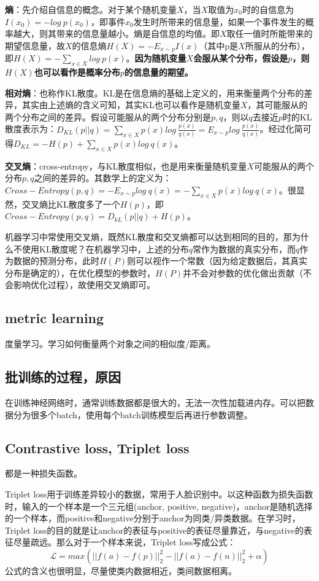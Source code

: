 \textbf{熵}：先介绍自信息的概念。对于某个随机变量$X$，当$X$取值为$x_0$时的自信息为$I(x_0) = -log\ p(x_0)$，即事件$x_0$发生时所带来的信息量，如果一个事件发生的概率越大，则其带来的信息量越小。熵是自信息的均值。即$X$取任一值时所能带来的期望信息量，故$X$的信息熵$H(X) = -E_{x\sim p}I(x)$（其中p是$X$所服从的分布），即$H(X) = -\sum_{x \in X}log\ p(x)$。\textbf{因为随机变量$X$会服从某个分布，假设是$p$，则$H(X)$也可以看作是概率分布$p$的信息量的期望。}

\textbf{相对熵}：也称作KL散度。KL是在信息熵的基础上定义的，用来衡量两个分布的差异，其实由上述熵的含义可知，其实KL也可以看作是随机变量$X$，其可能服从的两个分布之间的差异。假设可能服从的两个分布分别是$p, q$，则以$q$去接近$p$时的KL散度表示为：$D_{KL}(p||q) = \sum_{x \in X} p(x) log\ \frac{p(x)}{q(x)} = E_{x\sim p} log\ \frac{p(x)}{q(x)}$。经过化简可得$D_{KL} = -H(p) + \sum_{x \in X}p(x)log\ q(x)$。

\textbf{交叉熵}：\label{ce}cross-entropy，与KL散度相似，也是用来衡量随机变量$X$可能服从的两个分布$p, q$之间的差异的。其数学上的定义为：$Cross-Entropy(p, q) = -E_{x\sim p} log\ q(x) = - \sum_{x \in X}p(x)log\ q(x)$。很显然，交叉熵比KL散度多了一个$H(p)$，即$Cross-Entropy(p, q) = D_{kL}(p || q) + H(p)$。

机器学习中常使用交叉熵，既然KL散度和交叉熵都可以达到相同的目的，那为什么不使用KL散度呢？在机器学习中，上述的分布$q$常作为数据的真实分布，而$q$作为数据的预测分布，此时$H(P)$则可以视作一个常数（因为给定数据后，其真实分布是确定的），在优化模型的参数时，$H(P)$并不会对参数的优化做出贡献（不会影响优化过程），故使用交叉熵即可。

\subsection{metric learning} 
度量学习。学习如何衡量两个对象之间的相似度/距离。



\subsection{批训练的过程，原因}
在训练神经网络时，通常训练数据都是很大的，无法一次性加载进内存。可以把数据分为很多个batch，使用每个batch训练模型后再进行参数调整。

\subsection{Contrastive loss, Triplet loss} 
都是一种损失函数。

Triplet loss用于训练差异较小的数据，常用于人脸识别中。以这种函数为损失函数时，输入的一个样本是一个三元组(anchor, positive, negative)，anchor是随机选择的一个样本，而positive和negative分别于anchor为同类/异类数据。在学习时，Triplet loss的目的就是让anchor的表征与positive的表征尽量靠近，与negative的表征尽量疏远。那么对于一个样本来说，Triplet loss写成公式： $$\mathcal{L} = max( ||f(a)-f(p)||_2^2 - ||f(a) - f(n)||_2^2 + \alpha )
$$
公式的含义也很明显，尽量使类内数据相近，类间数据相离。

